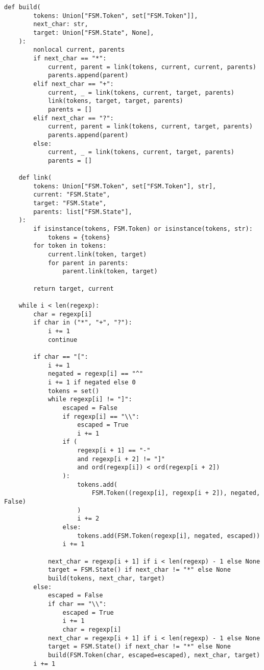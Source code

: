 \documentclass[12pt]{report}
\begin{document}
\begin{itemize}
\begin{lstlisting}[caption={\texttt{FSM.compile}}]
    def build(
        tokens: Union["FSM.Token", set["FSM.Token"]],
        next_char: str,
        target: Union["FSM.State", None],
    ):
        nonlocal current, parents
        if next_char == "*":
            current, parent = link(tokens, current, current, parents)
            parents.append(parent)
        elif next_char == "+":
            current, _ = link(tokens, current, target, parents)
            link(tokens, target, target, parents)
            parents = []
        elif next_char == "?":
            current, parent = link(tokens, current, target, parents)
            parents.append(parent)
        else:
            current, _ = link(tokens, current, target, parents)
            parents = []

    def link(
        tokens: Union["FSM.Token", set["FSM.Token"], str],
        current: "FSM.State",
        target: "FSM.State",
        parents: list["FSM.State"],
    ):
        if isinstance(tokens, FSM.Token) or isinstance(tokens, str):
            tokens = {tokens}
        for token in tokens:
            current.link(token, target)
            for parent in parents:
                parent.link(token, target)

        return target, current

    while i < len(regexp):
        char = regexp[i]
        if char in ("*", "+", "?"):
            i += 1
            continue

        if char == "[":
            i += 1
            negated = regexp[i] == "^"
            i += 1 if negated else 0
            tokens = set()
            while regexp[i] != "]":
                escaped = False
                if regexp[i] == "\\":
                    escaped = True
                    i += 1
                if (
                    regexp[i + 1] == "-"
                    and regexp[i + 2] != "]"
                    and ord(regexp[i]) < ord(regexp[i + 2])
                ):
                    tokens.add(
                        FSM.Token((regexp[i], regexp[i + 2]), negated, False)
                    )
                    i += 2
                else:
                    tokens.add(FSM.Token(regexp[i], negated, escaped))
                i += 1

            next_char = regexp[i + 1] if i < len(regexp) - 1 else None
            target = FSM.State() if next_char != "*" else None
            build(tokens, next_char, target)
        else:
            escaped = False
            if char == "\\":
                escaped = True
                i += 1
                char = regexp[i]
            next_char = regexp[i + 1] if i < len(regexp) - 1 else None
            target = FSM.State() if next_char != "*" else None
            build(FSM.Token(char, escaped=escaped), next_char, target)
        i += 1


\end{lstlisting}
\end{itemize}
\end{document}
